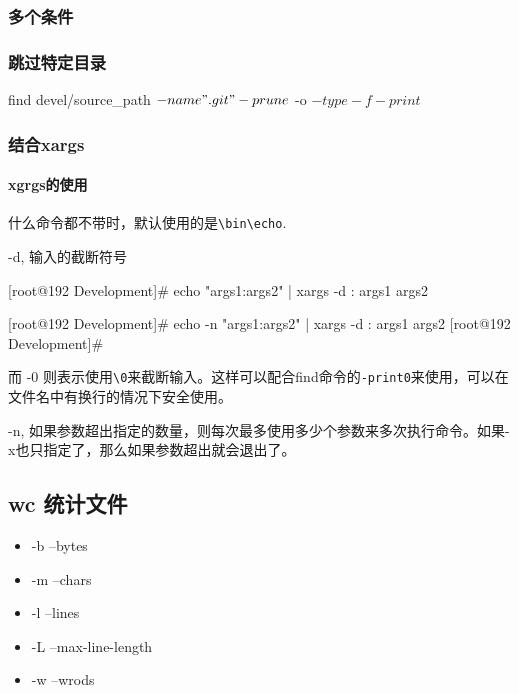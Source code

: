 \subsubsection{多个条件}

\subsubsection{跳过特定目录}

\begin{Bash}[]

find devel/source_path \( -name ".git" -prune \) -o \( -type -f -print \)

\end{Bash}

\subsubsection{结合xargs}

\paragraph{xgrgs的使用}

什么命令都不带时，默认使用的是\lstinline$\bin\echo$.

-d, 输入的截断符号

\begin{Bash}

[root@192 Development]# echo "args1:args2" | xargs -d :
args1 args2

[root@192 Development]# echo -n "args1:args2" | xargs -d :
args1 args2
[root@192 Development]# 

\end{Bash}

而 -0 则表示使用\lstinline$\0$来截断输入。这样可以配合find命令的\lstinline$-print0$来使用，可以在文件名中有换行的情况下安全使用。


-n, 如果参数超出指定的数量，则每次最多使用多少个参数来多次执行命令。如果-x也只指定了，那么如果参数超出就会退出了。



\subsection{wc 统计文件}

\begin{itemize}
\item -b --bytes
\item -m --chars
\item -l --lines
\item -L --max-line-length
\item -w --wrods
\end{itemize}

